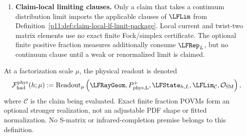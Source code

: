 \documentclass[12pt,a4paper]{article}
\begin{document}
\begin{definition}
\begin{enumerate}[label=\textnormal{(LF-\Alph*)},leftmargin=3.6em]
\begin{equation}
\end{equation}
and a normalized vector
\(|h,L;p_h^+\rangle\in E^{\rm phys}_{p_h,L}\mathcal H_{L,\rm sing}^{\rm QCD}\),
and either a declared state/beam alignment with one generated conjugate of the
clock--Hopf ray or an exact covariance theorem proving the readout independent
of that choice.  The vector may be supplied as a preparation or constructed on
the stable source-overlap branch of
Corollary~\ref{p11:cor:source-selected-fixed-momentum-state}; no construction is
inferred for a resonance residue.  The representation and conservation of the
total generator do not select this vector.  For an actually realized hadron
preparation or history, the corresponding token remains G0 occurrence content.

If the optional exact \(\LFRep_L\) certificate is additionally realized, clause
\textnormal{(R3)} gives
\(P_{F,L}^+=P_{\rm phys,L}^+\), so the Fock-sector projector used in
Appendix~\ref{p11:app:v264-exact-lfrep-positive-measures} coincides with
\(E^{\rm phys}_{p_h,L}\).
\item \textbf{Claim-local limiting clauses.}
Only a claim that takes a continuum distribution limit imports the applicable
clauses of \(\LFLim\) from
Definition~\ref{p11:def:claim-local-lf-limit-package}.  Local current and
twist-two matrix elements use no exact finite Fock/simplex certificate.  The
optional finite positive fraction measures additionally consume \(\LFRep_L\),
but no continuum clause until a weak or renormalized limit is claimed.
\end{enumerate}
At a factorization scale \(\mu\), the physical readout is denoted
\begin{equation}
\label{p11:eq:hadronic-functional-package}
\mathcal F_{\rm had}^{\rm phys}(h;\mu)
:=\operatorname{Readout}_{\mu}
\left(\LFRayGeom,P_{\rm phys,L}^+,\LFState_{h,L},
      \LFLim_{\mathcal C},\mathcal O_{\rm SM}\right),
\end{equation}
where \(\mathcal C\) is the claim being evaluated.  Exact finite fraction POVMs
form an optional stronger realization, not an adjustable PDF shape or fitted
normalization.  No S-matrix or infrared-completion premise belongs to this
definition.
\end{definition}
\end{document}
